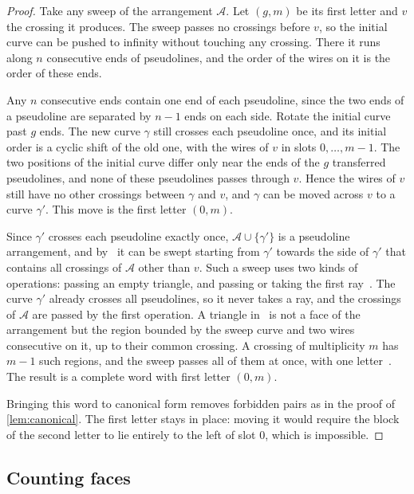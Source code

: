\begin{proof}
Take any sweep of the arrangement $\mathcal A$.
Let $(g,m)$ be its first letter and $v$ the crossing it produces.
The sweep passes no crossings before $v$, so the initial curve can be pushed to infinity without touching any crossing. There it runs along $n$ consecutive ends of pseudolines, and the order of the wires on it is the order of these ends.

Any $n$ consecutive ends contain one end of each pseudoline, since the two ends of a pseudoline are separated by $n-1$ ends on each side.
Rotate the initial curve past $g$ ends.
The new curve $\gamma$ still crosses each pseudoline once, and its initial order is a cyclic shift of the old one, with the wires of $v$ in slots $0,\ldots,m-1$.
The two positions of the initial curve differ only near the ends of the $g$ transferred pseudolines, and none of these pseudolines passes through $v$.
Hence the wires of $v$ still have no other crossings between $\gamma$ and $v$, and $\gamma$ can be moved across $v$ to a curve $\gamma'$. This move is the first letter $(0,m)$.

Since $\gamma'$ crosses each pseudoline exactly once, $\mathcal A\cup\{\gamma'\}$ is a pseudoline arrangement, and by~\cite[Theorem~3.1]{sh89} it can be swept starting from $\gamma'$ towards the side of $\gamma'$ that contains all crossings of $\mathcal A$ other than $v$.
Such a sweep uses two kinds of operations: passing an empty triangle, and passing or taking the first ray~\cite[Lemma~3.1]{sh89}.
The curve $\gamma'$ already crosses all pseudolines, so it never takes a ray, and the crossings of $\mathcal A$ are passed by the first operation.
A triangle in~\cite{sh89} is not a face of the arrangement but the region bounded by the sweep curve and two wires consecutive on it, up to their common crossing.
A crossing of multiplicity $m$ has $m-1$ such regions, and the sweep passes all of them at once, with one letter~\cite[p.~356]{sh89}.
The result is a complete word with first letter $(0,m)$.

Bringing this word to canonical form removes forbidden pairs as in the proof of \cref{lem:canonical}.
The first letter stays in place: moving it would require the block of the second letter to lie entirely to the left of slot 0, which is impossible.
\end{proof}

\subsection{Counting faces}

